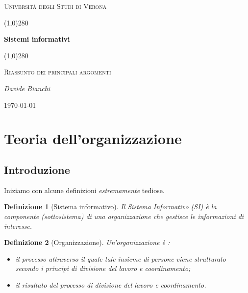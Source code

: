 \documentclass[a4paper, 11pt]{article}
\newtheorem{definit}{Definizione}[subsection]
\begin{document}
	\clearpage
	\begin{titlepage}
		\centering
		\vspace*{\fill}
		{\scshape\LARGE Università degli Studi di Verona \par}
		\vspace{1.5cm}
		\line(1,0){280} \\
		{\huge\bfseries Sistemi informativi\par}
		\line(1,0){280} \\
		\vspace{0.5cm}
		{\scshape\Large Riassunto dei principali argomenti\par}
		\vspace{2cm}
		{\Large\itshape Davide Bianchi\par}
		\vspace{1cm}
		
		\vspace{5cm}
		\vspace*{\fill}
		{\large \today\par}
	\end{titlepage}
	\thispagestyle{empty}
	\newpage
	\tableofcontents
	\newpage
	
	
	\section{Teoria dell'organizzazione}
	\subsection{Introduzione}
	Iniziamo con alcune definizioni \textit{estremamente} tediose.
	\begin{definit}[Sistema informativo]
		Il Sistema Informativo (SI) è la componente (sottosistema) di una organizzazione che gestisce le informazioni di interesse.
	\end{definit}
	
	\begin{definit}[Organizzazione]
		Un’organizzazione è : \begin{itemize}
			\item il processo attraverso il quale tale insieme di persone viene strutturato secondo i principi di divisione del lavoro e coordinamento;
			\item il risultato del processo di divisione del lavoro e coordinamento.
		\end{itemize}
	\end{definit}
	
\end{document}
